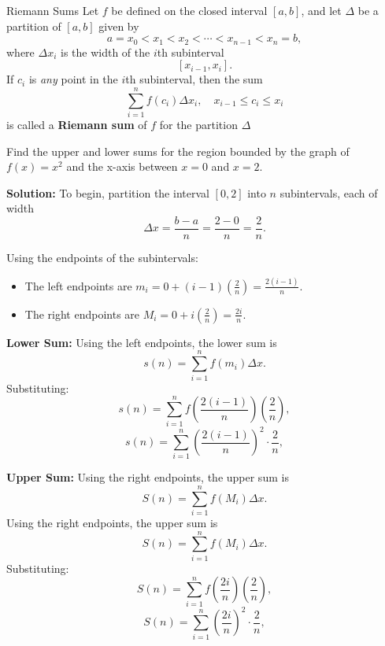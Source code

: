 \documentclass[12pt]{article}
\theoremstyle{beautifulthm}
\begin{document}
\begin{Definition}{Riemann Sums}{}
Let $f$ be defined on the closed interval $[a, b]$, and let $\Delta$ be a partition of $[a, b]$ given by
\[
a = x_0 < x_1 < x_2 < \cdots < x_{n-1} < x_n = b,
\]
where $\Delta x_i$ is the width of the $i$th subinterval 
\[
[x_{i-1}, x_i].
\]
If $c_i$ is \textit{any} point in the $i$th subinterval, then the sum
\[
\sum_{i=1}^n f(c_i) \Delta x_i, \quad x_{i-1} \leq c_i \leq x_i
\]
is called a \textbf{Riemann sum} of $f$ for the partition $\Delta$
    
\end{Definition}



\begin{tcolorbox}[colback=examplebg, colframe=red!75!black, title=\textbf{EXAMPLE 4: Finding Upper and Lower Sums for a Region}, fonttitle=\bfseries, sharp corners]
Find the upper and lower sums for the region bounded by the graph of \( f(x) = x^2 \) and the x-axis between \( x = 0 \) and \( x = 2 \).

\tcblower
\textbf{Solution:} 
To begin, partition the interval \([0, 2]\) into \( n \) subintervals, each of width
\[
\Delta x = \frac{b-a}{n} = \frac{2-0}{n} = \frac{2}{n}.
\]

\noindent Using the endpoints of the subintervals:
\begin{itemize}
    \item The left endpoints are \( m_i = 0 + (i-1)\left(\frac{2}{n}\right) = \frac{2(i-1)}{n} \).
    \item The right endpoints are \( M_i = 0 + i\left(\frac{2}{n}\right) = \frac{2i}{n} \).
\end{itemize}

\textbf{Lower Sum:}
Using the left endpoints, the lower sum is
\[
s(n) = \sum_{i=1}^n f(m_i) \Delta x.
\]
Substituting:
\[
s(n) = \sum_{i=1}^n f\left(\frac{2(i-1)}{n}\right)\left(\frac{2}{n}\right),
\]
\[
s(n) = \sum_{i=1}^n \left(\frac{2(i-1)}{n}\right)^2 \cdot \frac{2}{n},
\]



\textbf{Upper Sum:}
Using the right endpoints, the upper sum is
\[
S(n) = \sum_{i=1}^n f(M_i) \Delta x.
\]
Using the right endpoints, the upper sum is
\[
S(n) = \sum_{i=1}^n f(M_i) \Delta x.
\]
Substituting:
\[
S(n) = \sum_{i=1}^n f\left(\frac{2i}{n}\right)\left(\frac{2}{n}\right),
\]
\[
S(n) = \sum_{i=1}^n \left(\frac{2i}{n}\right)^2 \cdot \frac{2}{n},
\]
\end{tcolorbox}
\end{document}

